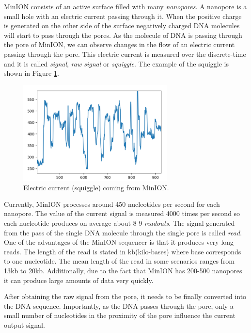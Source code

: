 MinION consists of an active surface filled with many \textit{nanopores}. A nanopore
is a small hole with an electric current passing through it. When the positive charge
is generated on the other side of the surface negatively charged DNA molecules
will start to pass through the pores. As the molecule of DNA is passing through the pore of
MinION, we can observe changes in the flow of an electric current passing through the pore.
This electric current is measured over the discrete-time and it is called \textit{signal},
\textit{raw signal} or \textit{squiggle}. The example of the squiggle is shown in Figure \ref{obr:minIonCurrent}.

\begin{figure}
\centerline{\includegraphics[width=0.7\textwidth, height=0.3\textheight]{images/signal}}
\caption[MinION signal]{Electric current (squiggle) coming from MinION.}
\label{obr:minIonCurrent}
\end{figure}

Currently, MinION processes around 450 nucleotides per second for each nanopore.
The value of the current signal is measured 4000 times per second so each
nucleotide produces on average about 8-9 \textit{readouts}. The signal
generated from the pass of the single DNA molecule through the single pore is called \textit{read}.
One of the advantages of the MinION sequencer is that it produces very long reads.
The length of the read is stated in kb(kilo-bases) where base corresponds to one nucleotide.
The mean length of the read in some scenarios ranges from 13kb to 20kb. Additionally,
due to the fact that MinION has 200-500 nanopores it can produce large amounts of
data very quickly.


After obtaining the raw signal from the pore, it needs to be finally converted into the DNA
sequence. Importantly, as the DNA passes through the pore, only a small
number of nucleotides in the proximity of the pore influence the current output signal.

